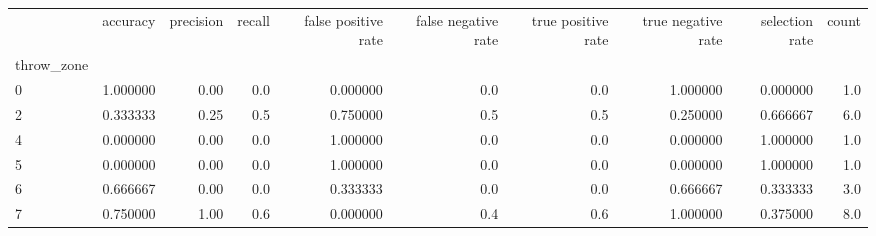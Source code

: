 \begin{tabular}{lrrrrrrrrr}
\toprule
{} &  accuracy &  precision &  recall &  false positive rate &  false negative rate &  true positive rate &  true negative rate &  selection rate &  count \\
throw\_zone &           &            &         &                      &                      &                     &                     &                 &        \\
\midrule
0          &  1.000000 &       0.00 &     0.0 &             0.000000 &                  0.0 &                 0.0 &            1.000000 &        0.000000 &    1.0 \\
2          &  0.333333 &       0.25 &     0.5 &             0.750000 &                  0.5 &                 0.5 &            0.250000 &        0.666667 &    6.0 \\
4          &  0.000000 &       0.00 &     0.0 &             1.000000 &                  0.0 &                 0.0 &            0.000000 &        1.000000 &    1.0 \\
5          &  0.000000 &       0.00 &     0.0 &             1.000000 &                  0.0 &                 0.0 &            0.000000 &        1.000000 &    1.0 \\
6          &  0.666667 &       0.00 &     0.0 &             0.333333 &                  0.0 &                 0.0 &            0.666667 &        0.333333 &    3.0 \\
7          &  0.750000 &       1.00 &     0.6 &             0.000000 &                  0.4 &                 0.6 &            1.000000 &        0.375000 &    8.0 \\
\bottomrule
\end{tabular}
